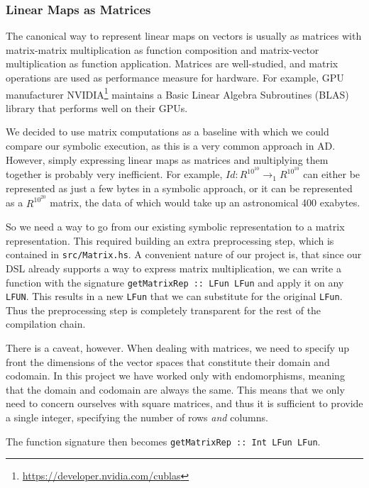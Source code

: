 \subsubsection{Linear Maps as Matrices}

The canonical way to represent linear maps on vectors is usually as matrices
with matrix-matrix multiplication as function composition and matrix-vector
multiplication as function application.  Matrices are well-studied, and matrix
operations are used as performance measure for hardware.  For example, GPU manufacturer
NVIDIA\footnote{\url{https://developer.nvidia.com/cublas}} maintains a Basic
Linear Algebra Subroutines (BLAS) library that performs well on their GPUs.

We decided to use matrix computations as a baseline with which we could compare
our symbolic execution, as this is a very common approach in AD. However, simply
expressing linear maps as matrices and multiplying them together is probably very
inefficient. For example, $Id : R^{10^{10}} \rightarrow_1 R^{10^{10}}$ can either be
represented as just a few bytes in a symbolic approach, or it can be represented as a
$R^{10^{20}}$ matrix, the data of which would take up an astronomical 400 exabytes.

So we need a way to go from our existing symbolic
representation to a matrix representation.  This required building an extra
preprocessing step, which is contained in \texttt{src/Matrix.hs}.  A convenient
nature of our project is, that since our DSL already supports a way to express
matrix multiplication, we can write a function with the signature
\texttt{getMatrixRep :: LFun \rightarrow{} LFun} and apply it on any
\texttt{LFUN}.  This results in a new \texttt{LFun} that we can substitute for
the original \texttt{LFun}.  Thus the preprocessing step is completely
transparent for the rest of the compilation chain.

There is a caveat, however.  When dealing with matrices, we need to specify up
front the dimensions of the vector spaces that constitute their domain and
codomain.  In this project we have worked only with endomorphisms, meaning that
the domain and codomain are always the same.  This means that we only need to concern
ourselves with square matrices, and thus it is sufficient to provide a single
integer, specifying the number of {rows} \textit{and} {columns}.

The function signature then becomes \texttt{getMatrixRep :: Int \rightarrow{}
LFun \rightarrow{} LFun}.

